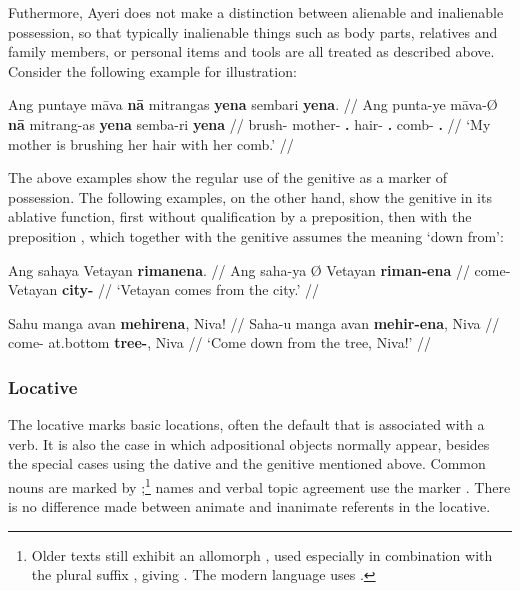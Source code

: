\xe

Futhermore, Ayeri does not make a distinction between alienable and inalienable 
possession, so that typically inalienable things such as body parts, 
relatives and family members, or personal items and tools are all treated 
as described above. Consider the following example for illustration:

\ex\begingl
	\gla Ang puntaye māva \textbf{nā} mitrangas \textbf{yena} sembari 
		\textbf{yena}. //
	\glb Ang punta-ye māva-Ø \textbf{nā} mitrang-as \textbf{yena} semba-ri 
		\textbf{yena} //
	\glc \AgtT{} brush-\TsgF{} mother-\Top{} \textbf{\Fsg{}.\Gen{}} 
		hair-\Parg{} \textbf{\TsgF{}.\Gen{}} comb-\Ins{} 
		\textbf{\TsgF{}.\Gen{}} //
	\glft `My mother is brushing her hair with her comb.' //
\endgl\xe

The above examples show the regular use of the genitive as a marker of 
possession. The following examples, on the other hand, show the genitive in its 
ablative function, first without qualification by a preposition, then with the 
preposition , which together with the 
genitive assumes the meaning `down from':

\pex
\a\begingl
	\gla Ang sahaya {} Vetayan \textbf{rimanena}. //
	\glb Ang saha-ya Ø Vetayan \textbf{riman-ena} //
	\glc \AgtT{} come-\TsgM{} \Top{} Vetayan \textbf{city-\Gen{}} //
	\glft `Vetayan comes from the city.' //
\endgl

\a\begingl
	\gla Sahu manga avan \textbf{mehirena}, Niva! //
	\glb Saha-u manga avan \textbf{mehir-ena}, Niva //
	\glc come-\Imp{} \Dyn{} at.bottom \textbf{tree-\Gen{}}, Niva //
	\glft `Come down from the tree, Niva!' //
\endgl

\xe


\subsubsection{Locative}

The locative marks basic locations, often the default that is associated with a 
verb. It is also the case in which adpositional objects normally appear, 
besides the special cases using the dative and the genitive mentioned above. 
Common nouns are marked by ;\footnote{Older texts still exhibit 
an allomorph , used especially in combination with the plural 
suffix , giving . The modern language uses 
.} names and verbal topic agreement use the marker 
. There is no difference made between animate and inanimate 
referents in the locative.

